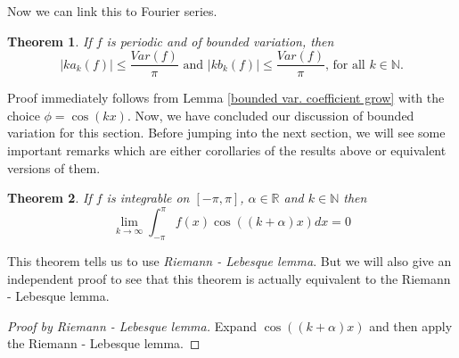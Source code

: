 \documentclass[12pt]{amsart}
\newtheorem{theorem}{Theorem}[section]
\theoremstyle{definition}
\newcommand{\NN}{{\mathbb N}} %
\newcommand{\RR}{{\mathbb R}} %
\begin{document}
Now we can link this to Fourier series.
\begin{theorem}\label{growth of ceof. of bdd. var.}
    If $f$ is periodic and of bounded variation, then
    \[
    |ka_k(f)|\leq \frac{Var(f)}{\pi}  \text{ and }  |kb_k(f)| \leq \frac{Var(f)}{\pi} \text{, for all $k \in \NN$.}
    \]
\end{theorem}


Proof immediately follows from Lemma \ref{bounded var. coefficient grow} with the choice $\phi = \cos(kx)$. Now, we have concluded our discussion of bounded variation for this section. Before jumping into the next section, we will see some important remarks which are either corollaries of the results above or equivalent versions of them.


\begin{theorem}\label{alternative riemann-lebesque lemma}
    If $f$ is integrable on $[-\pi, \pi]$, $\alpha \in \RR$ and $k \in \NN$ then
    \[
    \lim_{k \to \infty}\int_{-\pi}^{\pi}f(x)\cos((k+\alpha)x) dx = 0
    \]
\end{theorem}


This theorem tells us to use \emph{Riemann - Lebesque lemma}. But we will also give an independent proof to see that this theorem is actually equivalent to the Riemann - Lebesque lemma.


\begin{proof}[Proof by \textit{Riemann - Lebesque lemma}]
    Expand $\cos((k+\alpha)x)$ and then apply the Riemann - Lebesque lemma.
\end{proof}
\end{document}
